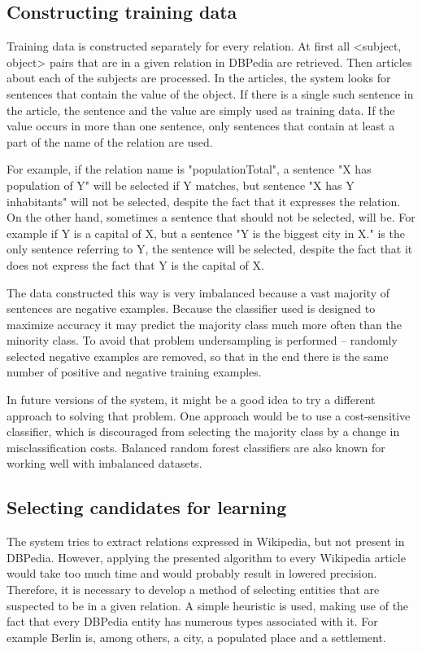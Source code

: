 \documentclass[10pt,a5paper,twoside]{article}
\begin{document}
\subsection{Constructing training data}
Training data is constructed separately for every relation. At first all <subject, object> pairs that are in a given relation in DBPedia are retrieved. Then articles about each of the subjects are processed. In the articles, the system looks for sentences that contain the value of the object. If there is a single such sentence in the article, the sentence and the value are simply used as training data. If the value occurs in more than one sentence, only sentences that contain at least a part of the name of the relation are used.

For example, if the relation name is "populationTotal", a sentence "X has population of Y" will be selected if Y matches, but sentence "X has Y inhabitants" will not be selected, despite the fact that it expresses the relation. On the other hand, sometimes a sentence that should not be selected, will be. For example if Y is a capital of X, but a sentence "Y is the biggest city in X." is the only sentence referring to Y, the sentence will be selected, despite the fact that it does not express the fact that Y is the capital of X.

The data constructed this way is very imbalanced because a vast majority of sentences are negative examples. Because the classifier used is designed to maximize accuracy it may predict the majority class much more often than the minority class. To avoid that problem undersampling is performed – randomly selected negative examples are removed, so that in the end there is the same number of positive and negative training examples. 

In future versions of the system, it might be a good idea to try a different approach to solving that problem. One approach would be to use a cost-sensitive classifier, which is discouraged from selecting the majority class by a change in misclassification costs. Balanced random forest classifiers are also known for working well with imbalanced datasets.

\subsection{Selecting candidates for learning}
The system tries to extract relations expressed in Wikipedia, but not present in DBPedia. However, applying the presented algorithm to every Wikipedia article would take too much time and would probably result in lowered precision. Therefore, it is necessary to develop a method of selecting entities that are suspected to be in a given relation. A simple heuristic is used, making use of the fact that every DBPedia entity has numerous types associated with it. For example Berlin is, among others, a city, a populated place and a settlement.
\end{document}

